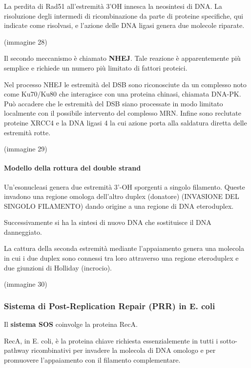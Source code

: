 \documentclass[]{article}
\begin{document}
La perdita di Rad51 all'estremità 3'OH innesca la neosintesi di DNA. La
risoluzione degli intermedi di ricombinazione da parte di proteine
specifiche, qui indicate come risolvasi, e l'azione delle DNA ligasi
genera due molecole riparate.

(immagine 28)

Il secondo meccanismo è chiamato \textbf{NHEJ}. Tale reazione è
apparentemente più semplice e richiede un numero più limitato di fattori
proteici.

Nel processo NHEJ le estremità del DSB sono riconosciute da un complesso
noto come Ku70/Ku80 che interagisce con una proteina chinasi, chiamata
DNA-PK. Può accadere che le estremità del DSB siano processate in modo
limitato localmente con il possibile intervento del complesso MRN.
Infine sono reclutate proteine XRCC4 e la DNA ligasi 4 la cui azione
porta alla saldatura diretta delle estremità rotte.

(immagine 29)

\paragraph{Modello della rottura del double
strand}\label{modello-della-rottura-del-double-strand}

Un'esonucleasi genera due estremità 3'-OH sporgenti a singolo filamento.
Queste invadono una regione omologa dell'altro duplex (donatore)
(INVASIONE DEL SINGOLO FILAMENTO) dando origine a una regione di DNA
eteroduplex.

Successivamente si ha la sintesi di nuovo DNA che sostituisce il DNA
danneggiato.

La cattura della seconda estremità mediante l'appaiamento genera una
molecola in cui i due duplex sono connessi tra loro attraverso una
regione eteroduplex e due giunzioni di Holliday (incrocio).

(immagine 30)

\subsubsection{Sistema di Post-Replication Repair (PRR) in E.
coli}\label{sistema-di-post-replication-repair-prr-in-e.-coli}

Il \textbf{sistema SOS} coinvolge la proteina RecA.

RecA, in E. coli, è la proteina chiave richiesta essenzialemente in
tutti i sotto-pathway ricombinativi per invadere la molecola di DNA
omologo e per promuovere l'appaiamento con il filamento complementare.
\end{document}
